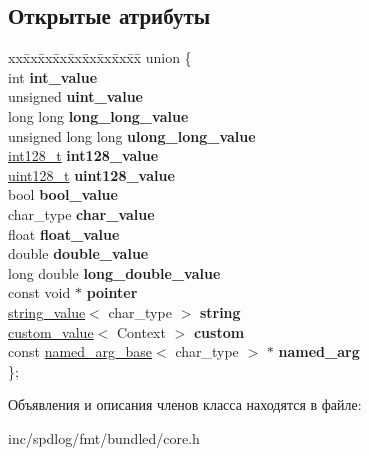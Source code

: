 \subsection*{Открытые атрибуты}
\begin{DoxyCompactItemize}
\item 
\mbox{\label{classinternal_1_1value_abf4ba4a5eeccb6911a5879f523899659}} 
\begin{tabbing}
xx\=xx\=xx\=xx\=xx\=xx\=xx\=xx\=xx\=\kill
union \{\\
\>int {\bfseries int\_value}\\
\>unsigned {\bfseries uint\_value}\\
\>long long {\bfseries long\_long\_value}\\
\>unsigned long long {\bfseries ulong\_long\_value}\\
\>\hyperlink{structinternal_1_1int128__t}{int128\_t} {\bfseries int128\_value}\\
\>\hyperlink{structinternal_1_1uint128__t}{uint128\_t} {\bfseries uint128\_value}\\
\>bool {\bfseries bool\_value}\\
\>char\_type {\bfseries char\_value}\\
\>float {\bfseries float\_value}\\
\>double {\bfseries double\_value}\\
\>long double {\bfseries long\_double\_value}\\
\>const void $\ast$ {\bfseries pointer}\\
\>\hyperlink{structinternal_1_1string__value}{string\_value}$<$ char\_type $>$ {\bfseries string}\\
\>\hyperlink{structinternal_1_1custom__value}{custom\_value}$<$ Context $>$ {\bfseries custom}\\
\>const \hyperlink{structinternal_1_1named__arg__base}{named\_arg\_base}$<$ char\_type $>$ $\ast$ {\bfseries named\_arg}\\
\}; \\

\end{tabbing}\end{DoxyCompactItemize}


Объявления и описания членов класса находятся в файле\+:\begin{DoxyCompactItemize}
\item 
inc/spdlog/fmt/bundled/core.\+h\end{DoxyCompactItemize}
